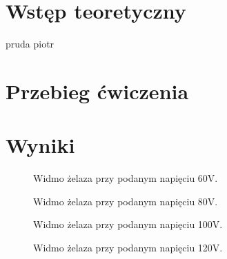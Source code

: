 \documentclass[11pt,a4paper]{article}
\begin{document}
\section{Wstęp teoretyczny}
pruda piotr
\section{Przebieg ćwiczenia}
\section{Wyniki}

\begin{figure}[H]
\centering
\resizebox{.8\linewidth}{!}{}
\caption{Widmo żelaza przy podanym napięciu 60V.}
\label{fig1}
\end{figure}

\begin{figure}[H]
\centering
\resizebox{.8\linewidth}{!}{}
\caption{Widmo żelaza przy podanym napięciu 80V.}
\label{fig1}
\end{figure}

\begin{figure}[H]
\centering
\resizebox{.8\linewidth}{!}{}
\caption{Widmo żelaza przy podanym napięciu 100V.}
\label{fig1}
\end{figure}

\begin{figure}[H]
\centering
\resizebox{.8\linewidth}{!}{}
\caption{Widmo żelaza przy podanym napięciu 120V.}
\label{fig1}
\end{figure}
\end{document}
